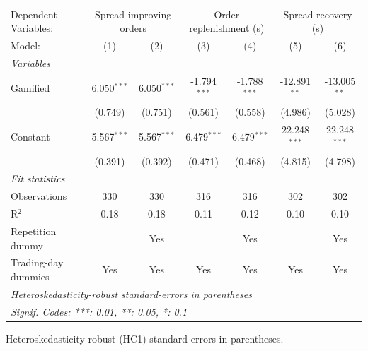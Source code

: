 \begingroup
\centering
\begin{tabular}{lcccccc}
   \tabularnewline \midrule \midrule
   Dependent Variables: & \multicolumn{2}{c}{Spread-improving orders} & \multicolumn{2}{c}{Order replenishment (s)} & \multicolumn{2}{c}{Spread recovery (s)}\\
   Model:              & (1)           & (2)           & (3)            & (4)            & (5)            & (6)\\  
   \midrule
   \emph{Variables}\\
   Gamified            & 6.050$^{***}$ & 6.050$^{***}$ & -1.794$^{***}$ & -1.788$^{***}$ & -12.891$^{**}$ & -13.005$^{**}$\\   
                       & (0.749)       & (0.751)       & (0.561)        & (0.558)        & (4.986)        & (5.028)\\   
   Constant            & 5.567$^{***}$ & 5.567$^{***}$ & 6.479$^{***}$  & 6.479$^{***}$  & 22.248$^{***}$ & 22.248$^{***}$\\   
                       & (0.391)       & (0.392)       & (0.471)        & (0.468)        & (4.815)        & (4.798)\\   
   \midrule
   \emph{Fit statistics}\\
   Observations        & 330           & 330           & 316            & 316            & 302            & 302\\  
   R$^2$               & 0.18          & 0.18          & 0.11           & 0.12           & 0.10           & 0.10\\  
   Repetition dummy    &               & Yes           &                & Yes            &                & Yes\\  
   Trading-day dummies & Yes           & Yes           & Yes            & Yes            & Yes            & Yes\\  
   \midrule \midrule
   \multicolumn{7}{l}{\emph{Heteroskedasticity-robust standard-errors in parentheses}}\\
   \multicolumn{7}{l}{\emph{Signif. Codes: ***: 0.01, **: 0.05, *: 0.1}}\\
\end{tabular}
 
\par \raggedright 
Heteroskedasticity-robust (HC1) standard errors in parentheses.
\par\endgroup
